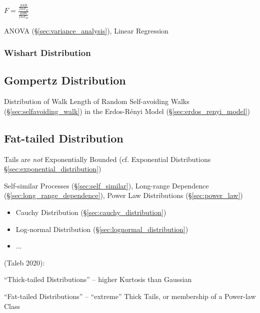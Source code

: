 $F = \frac{\frac{SSB}{DoF_B}}{\frac{SSW}{DoF_W}}$

ANOVA (\S\ref{sec:variance_analysis}), Linear Regression



\subsubsection{Wishart Distribution}\label{sec:wishart_distribution}



\subsection{Gompertz Distribution}\label{sec:gompertz_distribution}

Distribution of Walk Length of Random Self-avoiding Walks
(\S\ref{sec:selfavoiding_walk}) in the Erdos-R\'enyi Model
(\S\ref{sec:erdos_renyi_model})



\subsection{Fat-tailed Distribution}\label{sec:fat_tailed}

Tails are \emph{not} Exponentially Bounded (cf. Exponential Distributions
\S\ref{sec:exponential_distribution})

\fist Self-similar Processes (\S\ref{sec:self_similar}), Long-range Dependence
(\S\ref{sec:long_range_dependence}), Power Law Distributions
(\S\ref{sec:power_law})

\begin{itemize}
  \item Cauchy Distribution (\S\ref{sec:cauchy_distribution})
  \item Log-normal Distribution (\S\ref{sec:lognormal_distribution})
  \item ...
\end{itemize}

(Taleb 2020):

``Thick-tailed Distributions'' -- higher Kurtosis than Gaussian

``Fat-tailed Distributions'' -- ``extreme'' Thick Tails, or membership of a
Power-law Class



